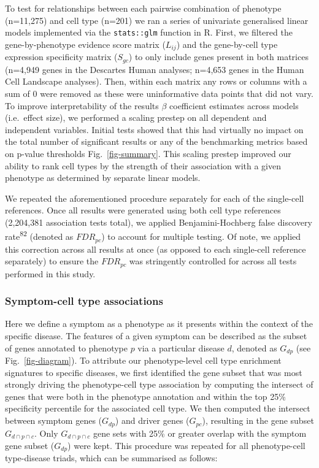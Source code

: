 \documentclass[
]{agujournal2019}
\begin{document}
To test for relationships between each pairwise combination of phenotype
(n=11,275) and cell type (n=201) we ran a series of univariate
generalised linear models implemented via the \texttt{stats::glm}
function in R. First, we filtered the gene-by-phenotype evidence score
matrix (\(L_{ij}\)) and the gene-by-cell type expression specificity
matrix (\(S_{gc}\)) to only include genes present in both matrices
(n=4,949 genes in the Descartes Human analyses; n=4,653 genes in the
Human Cell Landscape analyses). Then, within each matrix any rows or
columns with a sum of 0 were removed as these were uninformative data
points that did not vary. To improve interpretability of the results
\(\beta\) coefficient estimates across models (i.e.~effect size), we
performed a scaling prestep on all dependent and independent variables.
Initial tests showed that this had virtually no impact on the total
number of significant results or any of the benchmarking metrics based
on p-value thresholds Fig.~\ref{fig-summary}. This scaling prestep
improved our ability to rank cell types by the strength of their
association with a given phenotype as determined by separate linear
models.

We repeated the aforementioned procedure separately for each of the
single-cell references. Once all results were generated using both cell
type references (2,204,381 association tests total), we applied
Benjamini-Hochberg false discovery rate\textsuperscript{82} (denoted as
\(FDR_{pc}\)) to account for multiple testing. Of note, we applied this
correction across all results at once (as opposed to each single-cell
reference separately) to ensure the \(FDR_{pc}\) was stringently
controlled for across all tests performed in this study.

\subsubsection{Symptom-cell type
associations}\label{symptom-cell-type-associations}

Here we define a symptom as a phenotype as it presents within the
context of the specific disease. The features of a given symptom can be
described as the subset of genes annotated to phenotype \(p\) via a
particular disease \(d\), denoted as \(G_{dp}\) (see
Fig.~\ref{fig-diagram}). To attribute our phenotype-level cell type
enrichment signatures to specific diseases, we first identified the gene
subset that was most strongly driving the phenotype-cell type
association by computing the intersect of genes that were both in the
phenotype annotation and within the top 25\% specificity percentile for
the associated cell type. We then computed the intersect between symptom
genes (\(G_{dp}\)) and driver genes (\(G_{pc}\)), resulting in the gene
subset \(G_{d \cap p \cap c}\). Only \(G_{d \cap p \cap c}\) gene sets
with 25\% or greater overlap with the symptom gene subset (\(G_{dp}\))
were kept. This procedure was repeated for all phenotype-cell
type-disease triads, which can be summarised as follows:
\end{document}
